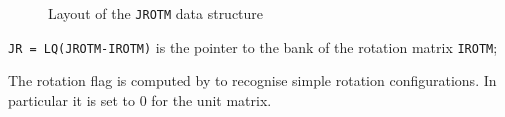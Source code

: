      
     
 
\begin{figure}[hbt]
     \centering
     \caption{Layout of the {\tt JROTM} data structure}
     \label{fg:geom299-1}
\end{figure}

{\tt JR = LQ(JROTM-IROTM)} is the
pointer to the bank of the rotation matrix {\tt IROTM};
 
The rotation flag is computed by  to 
recognise simple rotation configurations. In particular it
is set to 0 for the unit matrix. 
